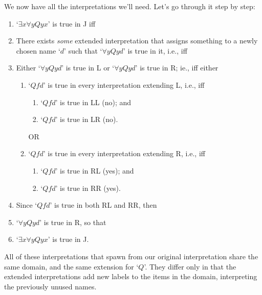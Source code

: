 We now have all the interpretations we'll need. Let's go through it step by step: \begin{enumerate}
	\item  `$\exists x \forall y Qyx$' is true in J iff 
	\item There exists \emph{some} extended interpretation that assigns something to a newly chosen name `$d$' such that `$\forall y Qyd$' is true in it, i.e., iff
	\item Either `$\forall y Qyd$' is true in L or `$\forall y Qyd$' is true in R; ie., iff either
 \begin{enumerate}
		\item `$Qfd$' is true in every interpretation extending L, i.e., iff \begin{enumerate}
			\item `$Qfd$' is true in LL (no); and
			\item `$Qfd$' is true in LR (no).
		\end{enumerate} OR
		\item  `$Qfd$' is true in every interpretation extending R, i.e., iff \begin{enumerate}
			\item `$Qfd$' is true in RL (yes); and
			\item `$Qfd$' is true in RR (yes).
		\end{enumerate}
	\end{enumerate}
	\item Since `$Qfd$' is true in both RL and RR, then
	\item `$\forall y Qyd$' is true in R, so that
	\item `$\exists x \forall y Qyx$' is true in J.
\end{enumerate}
All of these interpretations that spawn from our original interpretation share the same domain, and the same extension for `$Q$'. They differ only in that the extended interpretations add new labels to the items in the domain, interpreting the previously unused names. 

